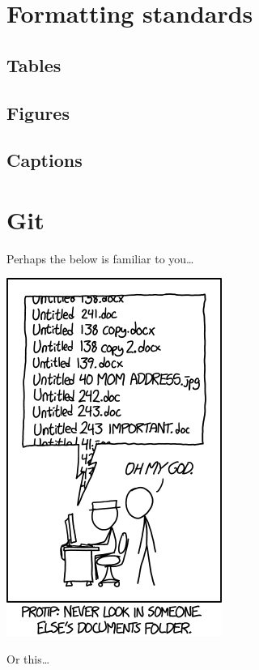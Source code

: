 \documentclass[
]{book}
\begin{document}
\hypertarget{formatting-standards}{%
\chapter{Formatting standards}\label{formatting-standards}}

\hypertarget{tables}{%
\section{Tables}\label{tables}}

\hypertarget{figures}{%
\section{Figures}\label{figures}}

\hypertarget{captions}{%
\section{Captions}\label{captions}}

\hypertarget{git}{%
\chapter{Git}\label{git}}

Perhaps the below is familiar to you\ldots{}

\includegraphics{img/version_control.png}

Or this\ldots{}
\end{document}
